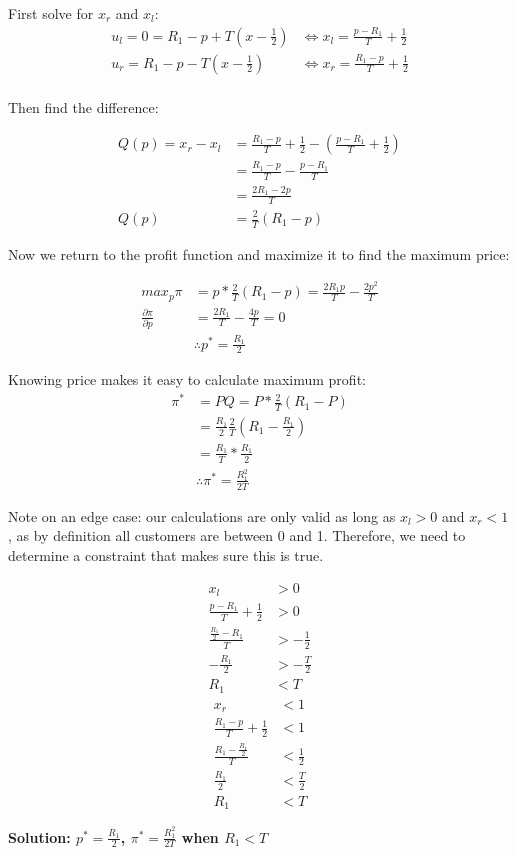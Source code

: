 \documentclass[12pt,letterpaper]{article}
\begin{document}
\begin{enumerate}
First solve for $x_r$ and $x_l$:
\begin{align*}
	u_l = 0 = R_1 - p + T(x-\frac{1}{2}) &\Leftrightarrow x_l = \frac{p-R_1}{T} + \frac{1}{2} \\
	u_r = R_1 - p - T(x - \frac{1}{2}) &\Leftrightarrow x_r = \frac{R_1 - p}{T} + \frac{1}{2} \\
\end{align*}

Then find the difference:

\begin{align*}
	Q(p) = x_r - x_l &= \frac{R_1 - p}{T} + \frac{1}{2} - (\frac{p-R_1}{T} + \frac{1}{2}) \\
	&= \frac{R_1 - p}{T} - \frac{p-R_1}{T} \\
	&= \frac{2R_1 - 2p}{T} \\
	Q(p) &= \frac{2}{T} (R_1 - p)
\end{align*}

Now we return to the profit function and maximize it to find the maximum price:

\begin{align*}
	max_p \pi &= p * \frac{2}{T}(R_1 - p) = \frac{2R_1p}{T} - \frac{2p^2}{T}\\
	\frac{\partial\pi}{\partial p} &= \frac{2R_1}{T} - \frac{4p}{T} = 0 \\
	&\therefore p^* = \frac{R_1}{2}
\end{align*}

Knowing price makes it easy to calculate maximum profit:
\begin{align*}
	\pi^* &= PQ = P * \frac{2}{T} (R_1 - P) \\
	&= \frac{R_1}{2} \frac{2}{T}(R_1-\frac{R_1}{2}) \\
	&= \frac{R_1}{T} * \frac{R_1}{2} \\
	&\therefore \pi^* = \frac{R_1^2}{2T}
\end{align*}

Note on an edge case: our calculations are only valid as long as $x_l > 0$ and $x_r < 1$, as by definition all customers are between 0 and 1. Therefore, we need to determine a constraint that makes sure this is true.

\begin{multicols}{2}
\noindent
	\begin{align*}
		x_l &> 0 \\
		\frac{p-R_1}{T} + \frac{1}{2} &> 0 \\
		\frac{\frac{R_1}{2} - R_1}{T} &> -\frac{1}{2} \\
		-\frac{R_1}{2} &> -\frac{T}{2} \\
		R_1 &< T
	\end{align*}
	\begin{align*}
		x_r &< 1 \\
		\frac{R_1 - p}{T} + \frac{1}{2} &< 1 \\
		\frac{R_1 - \frac{R_1}{2}}{T} &< \frac{1}{2} \\
		\frac{R_1}{2} &< \frac{T}{2} \\
		R_1 &< T
	\end{align*}
\end{multicols}


{\color{blue}\textbf{Solution: $p^* = \frac{R_1}{2}$, $\pi^* = \frac{R_1^2}{2T}$ when $R_1<T$}}
\end{enumerate}
	
\end{document}
